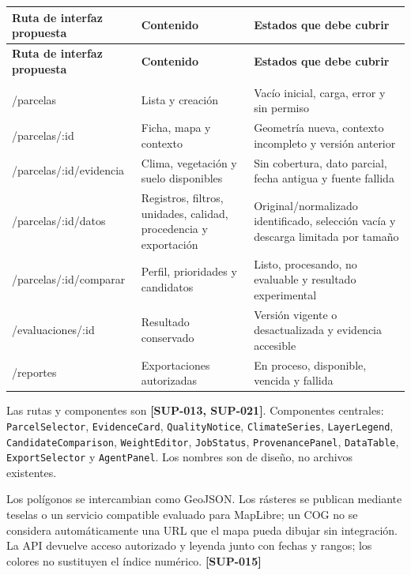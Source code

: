 \documentclass[10pt,a4paper]{article}
\begin{document}
\begingroup\small
\begin{longtable}{>{\raggedright\arraybackslash}p{3.647cm}>{\raggedright\arraybackslash}p{5.867cm}>{\raggedright\arraybackslash}p{6.343cm}}
\toprule
\textbf{Ruta de interfaz propuesta} & \textbf{Contenido} & \textbf{Estados que debe cubrir} \\
\midrule\endfirsthead
\toprule
\textbf{Ruta de interfaz propuesta} & \textbf{Contenido} & \textbf{Estados que debe cubrir} \\
\midrule\endhead
\midrule\multicolumn{3}{r}{\scriptsize Continúa en la página siguiente}\\\endfoot
\bottomrule\endlastfoot
/\allowbreak{}parcelas & Lista y creación & Vacío inicial, carga, error y sin permiso \\[3pt]
/\allowbreak{}parcelas/\allowbreak{}:id & Ficha, mapa y contexto & Geometría nueva, contexto incompleto y versión anterior \\[3pt]
/\allowbreak{}parcelas/\allowbreak{}:id/\allowbreak{}evidencia & Clima, vegetación y suelo disponibles & Sin cobertura, dato parcial, fecha antigua y fuente fallida \\[3pt]
/\allowbreak{}parcelas/\allowbreak{}:id/\allowbreak{}datos & Registros, filtros, unidades, calidad, procedencia y exportación & Original/\allowbreak{}normalizado identificado, selección vacía y descarga limitada por tamaño \\[3pt]
/\allowbreak{}parcelas/\allowbreak{}:id/\allowbreak{}comparar & Perfil, prioridades y candidatos & Listo, procesando, no evaluable y resultado experimental \\[3pt]
/\allowbreak{}evaluaciones/\allowbreak{}:id & Resultado conservado & Versión vigente o desactualizada y evidencia accesible \\[3pt]
/\allowbreak{}reportes & Exportaciones autorizadas & En proceso, disponible, vencida y fallida \\[3pt]
\end{longtable}
\endgroup

Las rutas y componentes son \textbf{[SUP-013, SUP-021]}. Componentes centrales: \texttt{ParcelSelector}, \texttt{EvidenceCard}, \texttt{QualityNotice}, \texttt{ClimateSeries}, \texttt{LayerLegend}, \texttt{CandidateComparison}, \texttt{WeightEditor}, \texttt{JobStatus}, \texttt{ProvenancePanel}, \texttt{DataTable}, \texttt{ExportSelector} y \texttt{AgentPanel}. Los nombres son de diseño, no archivos existentes.


Los polígonos se intercambian como GeoJSON. Los rásteres se publican mediante teselas o un servicio compatible evaluado para MapLibre; un COG no se considera automáticamente una URL que el mapa pueda dibujar sin integración. La API devuelve acceso autorizado y leyenda junto con fechas y rangos; los colores no sustituyen el índice numérico. \textbf{[SUP-015]}
\end{document}
